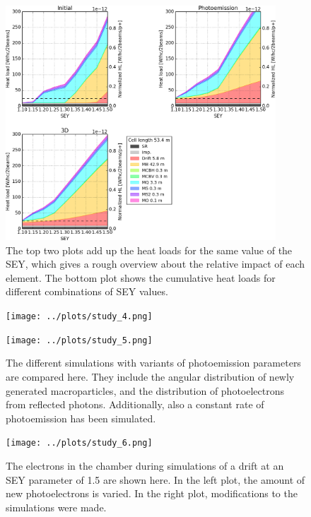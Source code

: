 \begin{figure}[tbh]
    \centering
    \includegraphics[width=0.9\textwidth]{../plots/summed_hl_1.png}
    \caption{The top two plots add up the heat loads for the same value of the SEY, which gives a rough overview about the relative impact of each element.
    The bottom plot shows the cumulative heat loads for different combinations of SEY values.
    }
    \label{fig:summed_hl}
\end{figure}

\begin{figure}[tbh]
    \centering
    \begin{minipage}[c]{0.8\textwidth}
        \texttt{[image: ../plots/study\_4.png]}
    \end{minipage}

    \vspace{0.5cm}

    \begin{minipage}[c]{0.8\textwidth}
        \texttt{[image: ../plots/study\_5.png]}
    \end{minipage}
    \caption{
        The different simulations with variants of photoemission parameters are compared here.
        They include the angular distribution of newly generated macroparticles, and the distribution of photoelectrons from reflected photons.
        Additionally, also a constant rate of photoemission has been simulated.
    }
    \label{fig:simulation2}
\end{figure}

\begin{figure}[tbh]
    \centering
    \texttt{[image: ../plots/study\_6.png]}
    \caption{The electrons in the chamber during simulations of a drift at an SEY parameter of 1.5 are shown here.
    In the left plot, the amount of new photoelectrons is varied.
    In the right plot, modifications to the simulations were made.}
    \label{fig:simulation_electrons}
\end{figure}

